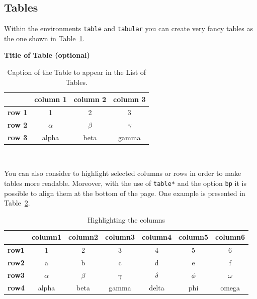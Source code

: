 \documentclass{Configuration_Files/PoliMi3i_thesis}
\begin{document}
\subsection{Tables}
\label{subsec:tables}

Within the environments \texttt{table} and  \texttt{tabular} you can create very fancy tables as the one shown in Table~\ref{table:example}.
\begin{table}[H]
    \caption*{\textbf{Title of Table (optional)}}
    \centering 
    \begin{tabular}{|p{3em} c c c |}
    \hline
    \rowcolor{bluepoli!40} %
     & \textbf{column 1} & \textbf{column 2} & \textbf{column 3} \T\B \\
    \hline \hline
    \textbf{row 1} & 1 & 2 & 3 \T\B \\
    \textbf{row 2} & $\alpha$ & $\beta$ & $\gamma$ \T\B\\
    \textbf{row 3} & alpha & beta & gamma \B\\
    \hline
    \end{tabular}
    \\[10pt]
    \caption{Caption of the Table to appear in the List of Tables.}
    \label{table:example}
\end{table}

You can also consider to highlight selected columns or rows in order to make tables more readable.
Moreover, with the use of \texttt{table*} and the option \texttt{bp} it is possible to align them at the bottom of the page. One example is presented in Table~\ref{table:exampleC}. 

\begin{table}[H]
\centering 
    \begin{tabular}{|p{3em} | c | c | c | c | c | c|}
    \hline
     & \textbf{column1} & \textbf{column2} & \textbf{column3} & \textbf{column4} & \textbf{column5} & \textbf{column6} \T\B \\
    \hline \hline
    \textbf{row1} & 1 & 2 & 3 & 4 & 5 & 6 \T\B\\
    \textbf{row2} & a & b & c & d & e & f \T\B\\
    \textbf{row3} & $\alpha$ & $\beta$ & $\gamma$ & $\delta$ & $\phi$ & $\omega$ \T\B\\
    \textbf{row4} & alpha & beta & gamma & delta & phi & omega \B\\
    \hline
    \end{tabular}
    \\[10pt]
    \caption{Highlighting the columns}
    \label{table:exampleC}
\end{table}
\end{document}
